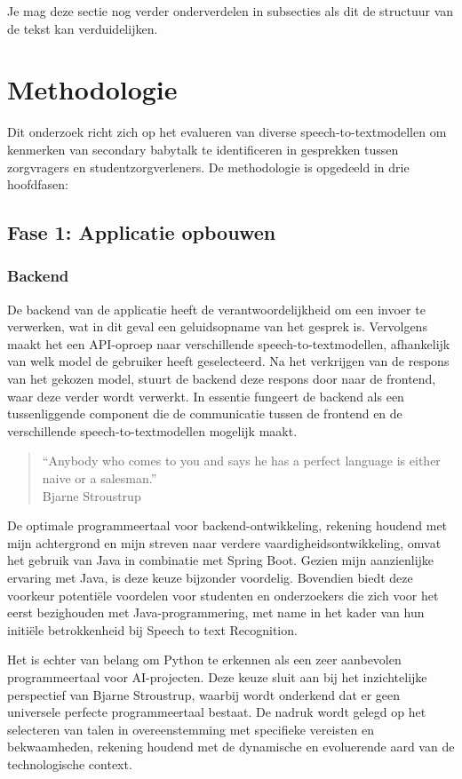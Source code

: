 Je mag deze sectie nog verder onderverdelen in subsecties als dit de structuur van de tekst kan verduidelijken.

\section{Methodologie}%
\label{sec:methodologie}
Dit onderzoek richt zich op het evalueren van diverse speech-to-textmodellen om kenmerken van secondary babytalk te identificeren in gesprekken tussen zorgvragers en studentzorgverleners. De methodologie is opgedeeld in drie hoofdfasen:
\subsection{Fase 1: Applicatie opbouwen}
\subsubsection{Backend}
De backend van de applicatie heeft de verantwoordelijkheid om een invoer te verwerken, wat in dit geval een geluidsopname van het gesprek is. Vervolgens maakt het een API-oproep naar verschillende speech-to-textmodellen, afhankelijk van welk model de gebruiker heeft geselecteerd. Na het verkrijgen van de respons van het gekozen model, stuurt de backend deze respons door naar de frontend, waar deze verder wordt verwerkt. In essentie fungeert de backend als een tussenliggende component die de communicatie tussen de frontend en de verschillende speech-to-textmodellen mogelijk maakt.

\begin{quote}
    “Anybody who comes to you and says he has a perfect language is either naive or a salesman.” \\
    \textemdash Bjarne Stroustrup
\end{quote}

De optimale programmeertaal voor backend-ontwikkeling, rekening houdend met mijn achtergrond en mijn streven naar verdere vaardigheidsontwikkeling, omvat het gebruik van Java in combinatie met Spring Boot. Gezien mijn aanzienlijke ervaring met Java, is deze keuze bijzonder voordelig. Bovendien biedt deze voorkeur potentiële voordelen voor studenten en onderzoekers die zich voor het eerst bezighouden met Java-programmering, met name in het kader van hun initiële betrokkenheid bij Speech to text Recognition.

Het is echter van belang om Python te erkennen als een zeer aanbevolen programmeertaal voor AI-projecten. Deze keuze sluit aan bij het inzichtelijke perspectief van Bjarne Stroustrup, waarbij wordt onderkend dat er geen universele perfecte programmeertaal bestaat. De nadruk wordt gelegd op het selecteren van talen in overeenstemming met specifieke vereisten en bekwaamheden, rekening houdend met de dynamische en evoluerende aard van de technologische context.

